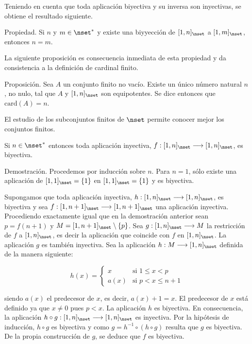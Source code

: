 Teniendo en cuenta que toda aplicación biyectiva y su inversa son
inyectivas, se obtiene el resultado siguiente.

Propiedad. Si $n$ y $m \in \nset^*$ y existe una biyyección de $[1,
n]_{\nset}$ a $[1, m]_{\nset}$, entonces $n = m$.

La siguiente proposición es consecuencia inmediata de esta propiedad y da
consistencia a la definición de cardinal finito.

Proposición. Sea $A$ un conjunto finito no vacío. Existe un único número
natural $n$, no nulo, tal que $A$ y $[1, n]_{\nset}$ son equipotentes. Se
dice entonces que $\text{card}(A) = n$.

El estudio de los subconjuntos finitos de $\nset$ permite conocer mejor los
conjuntos finitos.

Si $n \in \nset^*$ entonces toda aplicación inyectiva, $f: [1, n]_{\nset}
\longrightarrow [1, n]_{\nset}$, es biyectiva.

Demostración. Procedemos por inducción sobre $n$. Para $n = 1$, sólo existe
una aplicación de $[1, 1]_{\nset} = \{1\}$ en $[1, 1]_{\nset} = \{1\}$ y es
biyectiva.

Supongamos que toda aplicación inyectiva, $h: [1, n]_{\nset} \longrightarrow
[1, n]_{\nset}$, es biyectiva y sea $f: [1, n + 1]_{\nset} \longrightarrow
[1, n + 1]_{\nset}$ una aplicación inyectiva. Procediendo exactamente igual
que en la demostración anterior sean $p = f(n + 1)$ y $M = [1, n +
1]_{\nset} \setminus \{p\}$. Sea $g: [1, n]_{\nset} \longrightarrow M$ la
restricción de $f$ a $[1, n]_{\nset}$, es decir la aplicación que coincide
con $f$ en $[1, n]_{\nset}$. La aplicación $g$ es también inyectiva. Sea la
aplicación $h: M \longrightarrow [1, n]_{\nset}$ definida de la manera
siguiente:

$$
  h(x) =
  \begin{cases}
    x & \text{si } 1 \leq x < p \\
    a(x) & \text{si } p < x \leq n + 1
  \end{cases}
$$

\noindent siendo $a(x)$ el predecesor de $x$, es decir, $a(x) + 1 = x$. El
predecesor de $x$ está definido ya que $x \neq 0$ pues $p < x$. La
aplicación $h$ es biyectiva. En consecuencia, la aplicación $h \circ g: [1,
n]_{\nset} \longrightarrow [1, n]_{\nset}$ es inyectiva. Por la hipótesis de
inducción, $h \circ g$ es biyectiva y como $g = h^{-1} \circ (h \circ g)$
resulta que $g$ es biyectiva. De la propia construcción de $g$, se deduce
que $f$ es biyectiva.

